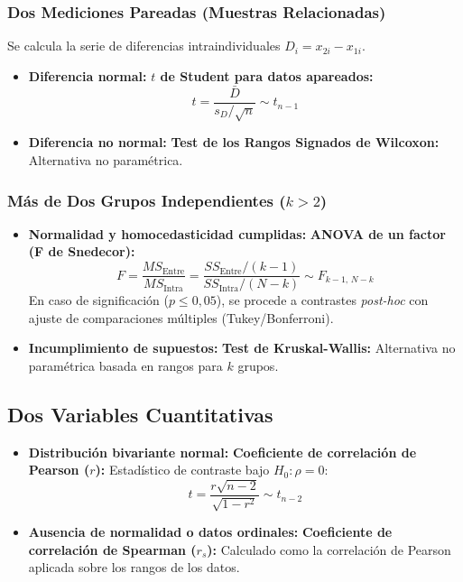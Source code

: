 \documentclass[11pt,a4paper]{report}
\theoremstyle{definition}
\begin{document}
\subsubsection{Dos Mediciones Pareadas (Muestras Relacionadas)}
Se calcula la serie de diferencias intraindividuales $D_i = x_{2i} - x_{1i}$.
\begin{itemize}[leftmargin=*]
    \item \textbf{Diferencia normal:}
    \textbf{$t$ de Student para datos apareados:}
    \begin{equation}
    t = \frac{\bar{D}}{s_D / \sqrt{n}} \sim t_{n-1}
    \end{equation}
    \item \textbf{Diferencia no normal:}
    \textbf{Test de los Rangos Signados de Wilcoxon:} Alternativa no paramétrica.
\end{itemize}

\subsubsection{Más de Dos Grupos Independientes ($k > 2$)}
\begin{itemize}[leftmargin=*]
    \item \textbf{Normalidad y homocedasticidad cumplidas:}
    \textbf{ANOVA de un factor (F de Snedecor):}
    \begin{equation}
    F = \frac{MS_{\text{Entre}}}{MS_{\text{Intra}}} = \frac{SS_{\text{Entre}} / (k - 1)}{SS_{\text{Intra}} / (N - k)} \sim F_{k-1, \, N-k}
    \end{equation}
    En caso de significación ($p \le 0{,}05$), se procede a contrastes \emph{post-hoc} con ajuste de comparaciones múltiples (Tukey/Bonferroni).
    \item \textbf{Incumplimiento de supuestos:}
    \textbf{Test de Kruskal-Wallis:} Alternativa no paramétrica basada en rangos para $k$ grupos.
\end{itemize}

\subsection{Dos Variables Cuantitativas}
\begin{itemize}[leftmargin=*]
    \item \textbf{Distribución bivariante normal:}
    \textbf{Coeficiente de correlación de Pearson ($r$):}
    Estadístico de contraste bajo $H_0: \rho = 0$:
    \begin{equation}
    t = \frac{r \sqrt{n - 2}}{\sqrt{1 - r^2}} \sim t_{n-2}
    \end{equation}
    \item \textbf{Ausencia de normalidad o datos ordinales:}
    \textbf{Coeficiente de correlación de Spearman ($r_s$):}
    Calculado como la correlación de Pearson aplicada sobre los rangos de los datos.
\end{itemize}
\end{document}
